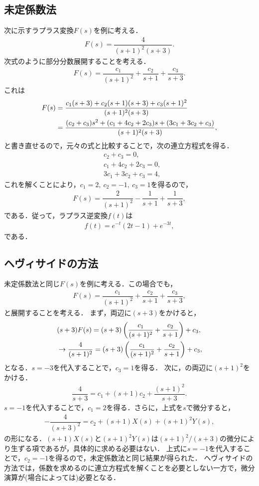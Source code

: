 \subsection{未定係数法}
%
次に示すラプラス変換$F(s)$を例に考える．
\begin{align}
 F(s) = \dfrac{4}{(s+1)^2(s+3)}. 
\end{align}
%
次式のように部分分数展開することを考える．
\begin{align}
 F(s) = \dfrac{c_1}{(s+1)^2} + \dfrac{c_2}{s+1} + \dfrac{c_3}{s+3}. 
\end{align}
%
これは
\begin{align}
 F(s) &= \dfrac{c_1(s+3)+c_2(s+1)(s+3) + c_3(s+1)^2}{(s+1)^2(s+3)} \notag \\
      &= \dfrac{(c_2+c_3)s^2+(c_1+4c_2+2c_3)s+(3c_1+3c_2+c_3)}{(s+1)^2(s+3)}, 
\end{align}
と書き直せるので，元々の式と比較することで，次の連立方程式を得る．
\begin{align}
  &c_2  +  c_3 = 0, \\
  &c_1  + 4c_2 + 2 c_3 = 0, \\
  &3c_1 + 3c_2 +   c_3 = 4, 
\end{align}
これを解くことにより，$c_1=2,~c_2=-1,~c_3=1$を得るので，
\begin{align}
 F(s) = \dfrac{2}{(s+1)^2} - \dfrac{1}{s+1} + \dfrac{1}{s+3}, 
\end{align}
である．従って，ラプラス逆変換$f(t)$は
\begin{align}
 f(t) = e^{-t}(2t - 1) + e^{-3t}, 
\end{align}
である．
%
\subsection{ヘヴィサイドの方法}
%
未定係数法と同じ$F(s)$を例に考える．この場合でも，
\begin{align}
 F(s) = \dfrac{c_1}{(s+1)^2} + \dfrac{c_2}{s+1} + \dfrac{c_3}{s+3}, \label{pfe_ex01} 
\end{align}
と展開することを考える．
まず，両辺に$(s+3)$をかけると，
\begin{align}
 &             (s+3)F(s)          = (s+3)\left(\dfrac{c_1}{(s+1)^2}+\dfrac{c_2}{s+1}\right) + c_3, \notag \\
 &\rightarrow  \dfrac{4}{(s+1)^2} = (s+3)\left(\dfrac{c_1}{(s+1)^2}+\dfrac{c_2}{s+1}\right) + c_3,
\end{align}
となる．$s=-3$を代入することで，$c_3=1$を得る．
次に，の両辺に$(s+1)^2$をかける．
\begin{align}
 \dfrac{4}{s+3} = c_1 + (s+1)c_2 + \dfrac{(s+1)^2}{s+3}. \label{pfe_ex01_heav01} 
\end{align}
$s=-1$を代入することで，$c_1 = 2$を得る．さらに，上式を$s$で微分すると，
\begin{align}
 -\dfrac{4}{(s+3)^2} = c_2 + (s+1)X(s) + (s+1)^2 Y(s), 
\end{align}
の形になる．$(s+1)X(s)$と$(s+1)^2Y(s)$は$(s+1)^2/(s+3)$の微分により生ずる項であるが，具体的に求める必要はない．
上式に$s=-1$を代入することで，$c_2 = -1$を得るので，未定係数法と同じ結果が得られた．
ヘヴィサイドの方法では，係数を求めるのに連立方程式を解くことを必要としない一方で，微分演算が(場合によっては)必要となる．

